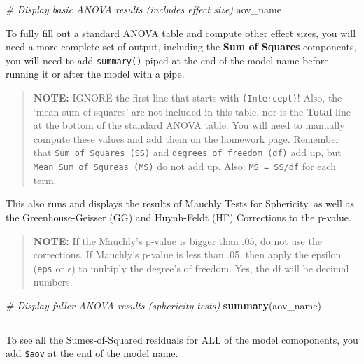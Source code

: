\documentclass[]{article}
\newenvironment{Shaded}{\begin{snugshade}}{\end{snugshade}}
\newcommand{\KeywordTok}[1]{\textcolor[rgb]{0.13,0.29,0.53}{\textbf{#1}}}
\newcommand{\CommentTok}[1]{\textcolor[rgb]{0.56,0.35,0.01}{\textit{#1}}}
\newcommand{\NormalTok}[1]{#1}
\begin{document}
\begin{Shaded}
\begin{Highlighting}[]
\CommentTok{# Display basic ANOVA results (includes effect size)}
\NormalTok{aov_name }
\end{Highlighting}
\end{Shaded}

\clearpage

To fully fill out a standard ANOVA table and compute other effect sizes,
you will need a more complete set of output, including the \textbf{Sum
of Squares} components, you will need to add \texttt{summary()} piped at
the end of the model name before running it or after the model with a
pipe.

\begin{quote}
\textbf{NOTE:} IGNORE the first line that starts with
\texttt{(Intercept)}! Also, the `mean sum of squares' are not included
in this table, nor is the \textbf{Total} line at the bottom of the
standard ANOVA table. You will need to manually compute these values and
add them on the homework page. Remember that
\texttt{Sum\ of\ Squares\ (SS)} and \texttt{degrees\ of\ freedom\ (df)}
add up, but \texttt{Mean\ Sum\ of\ Squreas\ (MS)} do not add up. Also:
\texttt{MS\ =\ SS/df} for each term.
\end{quote}

This also runs and displays the results of Mauchly Tests for Sphericity,
as well as the Greenhouse-Geisser (GG) and Huynh-Feldt (HF) Corrections
to the p-value.

\begin{quote}
\textbf{NOTE:} If the Mauchly's p-value is bigger than .05, do not use
the corrections. If Mauchly's p-value is less than .05, then apply the
epsilon (\texttt{eps} or \(\epsilon\)) to multiply the degree's of
freedom. Yes, the df will be decimal numbers.
\end{quote}

\begin{Shaded}
\begin{Highlighting}[]
\CommentTok{# Display fuller ANOVA results (sphericity tests)}
\KeywordTok{summary}\NormalTok{(aov_name)}
\end{Highlighting}
\end{Shaded}

\begin{center}\rule{0.5\linewidth}{\linethickness}\end{center}

To see all the Sumes-of-Squared residuals for ALL of the model
comoponents, you add \texttt{\$aov} at the end of the model name.
\end{document}
